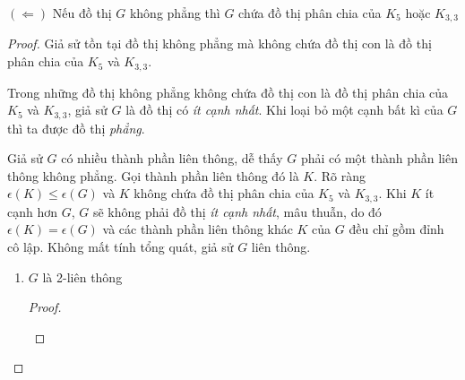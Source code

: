 $(\Leftarrow)$ Nếu đồ thị $G$ không phẳng thì $G$ chứa đồ thị phân chia của $K_5$ hoặc $K_{3,3}$
\begin{proof}
    Giả sử tồn tại đồ thị không phẳng mà không chứa đồ thị con là đồ thị phân chia của $K_5$ và $K_{3,3}$.

    Trong những đồ thị không phẳng không chứa đồ thị con là đồ thị phân chia của $K_5$ và $K_{3,3}$, giả sử $G$ là đồ thị có \textit{ít cạnh nhất}.
    Khi loại bỏ một cạnh bất kì của $G$ thì ta được đồ thị \textit{phẳng}.

    Giả sử $G$ có nhiều thành phần liên thông, dễ thấy $G$ phải có một thành phần liên thông không phẳng. Gọi thành phần liên thông đó là $K$.
    Rõ ràng $\epsilon(K) \leq \epsilon(G)$ và $K$ không chứa đồ thị phân chia của $K_5$ và $K_{3,3}$. Khi $K$ ít cạnh hơn $G$, $G$ sẽ không phải đồ thị \textit{ít cạnh nhất}, mâu thuẫn, do đó $\epsilon(K) = \epsilon(G)$
    và các thành phần liên thông khác $K$ của $G$ đều chỉ gồm đỉnh cô lập. Không mất tính tổng quát, giả sử $G$ liên thông.

    \begin{enumerate}
        \item $G$ là 2-liên thông
              \begin{proof}
                  \begin{figure}[H]
                      \centering
                  \end{figure}


\end{proof}
\end{enumerate}
\end{proof}
